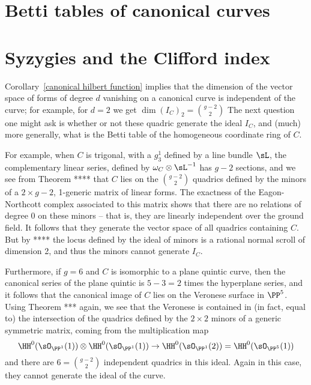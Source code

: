 \section{Betti tables of canonical curves}


\section{Syzygies and the Clifford index}


Corollary~\ref{canonical hilbert function} implies that the dimension of the vector space of forms of degree $d$
vanishing on a canonical curve is independent of the curve; for example, for $d=2$ we get
$
\dim ({I_{C}})_{2} = {g-2\choose 2}
$
The next question one might ask is whether or not these quadric generate the ideal $I_{C}$, and (much) more generally, what is the 
Betti table of the homogeneous coordinate ring of $C$.

 For example,
when $C$ is trigonal, with a $g^{1}_{3}$ defined by a line bundle $\sL$, the complementary linear series,
defined by $\omega_{C}\otimes \sL^{-1}$ has $g-2$ sections, and we see from Theorem ****
that $C$ lies on the ${g-2\choose 2}$ quadrics defined by the minors of a $2\times g-2$, 1-generic matrix of linear forms. The exactness of the Eagon-Northcott complex associated to this matrix shows that there are no relations of degree 0 on these minors -- that is, they are linearly independent over the ground field. It follows that they generate the vector space of all quadrics containing $C$. But by **** the locus defined by
the ideal of minors is a rational normal scroll of dimension 2, and thus the minors cannot generate $I_{C}$.

Furthermore, if $g = 6$ and $C$ is isomorphic to a plane quintic curve, then the canonical series of the plane quintic is $5-3 = 2$ times the hyperplane series, and it follows that the canonical image of $C$ lies on the Veronese surface in $\PP^{5}$. Using Theorem *** again, we see that the Veronese is contained in (in fact, equal to) the intersection of the quadrics defined by the $2\times 2$ minors of a generic symmetric matrix, coming from the 
multiplication map 
$$
\HH^{0}(\sO_{\PP^{1}}(1))\otimes \HH^{0}(\sO_{\PP^{1}}(1)) \to \HH^{0}(\sO_{\PP^{1}}(2)) = \HH^{0}(\sO_{\PP^{5}}(1))
$$
and there are $6 = {g-2\choose 2}$ independent quadrics in this ideal. Again in this case, they cannot generate the ideal of the curve.

